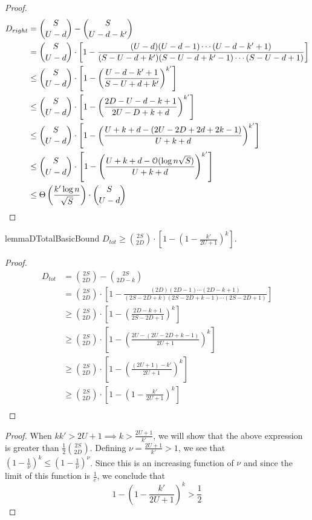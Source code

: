 \DRightBound*
\begin{proof}
\begin{align}
D_{right} &= {{S}\choose{U-d}}-{{S}\choose{U-d-k'}}\\
&= {{S}\choose{U-d}}\cdot \left[1-\frac{(U-d)(U-d-1)\cdots(U-d-k'+1)}{(S-U-d+k')(S-U-d+k'-1)\cdots(S-U-d+1)}\right]\\
&\le {{S}\choose{U-d}}\cdot \left[1-\left(\frac{U-d-k'+1}{S-U+d+k'}\right)^{k'}\right]\\
&\le {{S}\choose{U-d}}\cdot \left[1-\left(\frac{2D-U-d-k+1}{2U-D+k+d}\right)^{k'}\right]\\
&\le {{S}\choose{U-d}}\cdot \left[1-\left(\frac{U+k+d - (2U-2D+2d+2k-1)}{U+k+d}\right)^{k'}\right]\\
&\le {{S}\choose{U-d}}\cdot \left[1-\left(\frac{U+k+d - \Bo(\log n\sqrt S)}{U+k+d}\right)^{k'}\right]\\
&\le \Theta\left(\frac{k'\log n}{\sqrt{S}}\right)\cdot{{S}\choose{U-d}}
\end{align}
\end{proof}

\begin{restatable}{lemma}{DTotalBasicBound}
\label{lem:DTotalBasicBound}
$D_{tot} \ge {{2S}\choose{2D}}\cdot \left[1-\left(1 - \frac{k'}{2U+1}\right)^k\right]$.
\end{restatable}
\begin{proof}
\begin{align}
D_{tot} &= {{2S}\choose{2D}}-{{2S}\choose{2D-k}}\\
&= {{2S}\choose{2D}}\cdot \left[1-\frac{(2D)(2D-1)\cdots(2D-k+1)}{(2S-2D+k)(2S-2D+k-1)\cdots(2S-2D+1)}\right]\\
&\ge {{2S}\choose{2D}}\cdot \left[1-\left(\frac{2D-k+1}{2S-2D+1}\right)^k\right]\\
&\ge {{2S}\choose{2D}}\cdot \left[1-\left(\frac{2U-(2U-2D+k-1)}{2U+1}\right)^k\right]\\
&\ge {{2S}\choose{2D}}\cdot \left[1-\left(\frac{(2U+1)-k'}{2U+1}\right)^k\right]\\
&\ge {{2S}\choose{2D}}\cdot \left[1-\left(1 - \frac{k'}{2U+1}\right)^k\right]\\
\end{align}
\end{proof}


\DTotalFarBoundary*
\begin{proof}
When $kk' > 2U + 1 \implies k > \frac{2U+1}{k'}$,
we will show that the above expression is greater than $\frac 12 \binom{2S}{2D}$.
Defining $\nu = \frac{2U+1}{k'} > 1$, we see that $(1-\frac 1\nu)^k \le (1-\frac 1\nu)^\nu$.
Since this is an increasing function of $\nu$ and since the limit of this function is $\frac 1e$,
we conclude that
\[
1-\left(1 - \frac{k'}{2U+1}\right)^k > \frac 12
\]
\end{proof}

